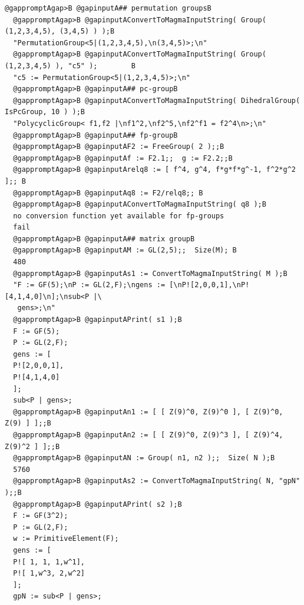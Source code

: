 \documentclass[a4paper,11pt]{report}
\begin{document}
{{{ 
\begin{Verbatim}[commandchars=@AB,fontsize=\small,frame=single,label=Example]
  @gappromptAgap>B @gapinputA## permutation groupsB
  @gappromptAgap>B @gapinputAConvertToMagmaInputString( Group( (1,2,3,4,5), (3,4,5) ) );B
  "PermutationGroup<5|(1,2,3,4,5),\n(3,4,5)>;\n"
  @gappromptAgap>B @gapinputAConvertToMagmaInputString( Group( (1,2,3,4,5) ), "c5" );        B
  "c5 := PermutationGroup<5|(1,2,3,4,5)>;\n"
  @gappromptAgap>B @gapinputA## pc-groupB
  @gappromptAgap>B @gapinputAConvertToMagmaInputString( DihedralGroup( IsPcGroup, 10 ) );B
  "PolycyclicGroup< f1,f2 |\nf1^2,\nf2^5,\nf2^f1 = f2^4\n>;\n"
  @gappromptAgap>B @gapinputA## fp-groupB
  @gappromptAgap>B @gapinputAF2 := FreeGroup( 2 );;B
  @gappromptAgap>B @gapinputAf := F2.1;;  g := F2.2;;B
  @gappromptAgap>B @gapinputArelq8 := [ f^4, g^4, f*g*f*g^-1, f^2*g^2 ];; B
  @gappromptAgap>B @gapinputAq8 := F2/relq8;; B
  @gappromptAgap>B @gapinputAConvertToMagmaInputString( q8 );B
  no conversion function yet available for fp-groups
  fail
  @gappromptAgap>B @gapinputA## matrix groupB
  @gappromptAgap>B @gapinputAM := GL(2,5);;  Size(M); B
  480
  @gappromptAgap>B @gapinputAs1 := ConvertToMagmaInputString( M );B
  "F := GF(5);\nP := GL(2,F);\ngens := [\nP![2,0,0,1],\nP![4,1,4,0]\n];\nsub<P |\
   gens>;\n"
  @gappromptAgap>B @gapinputAPrint( s1 );B
  F := GF(5);
  P := GL(2,F);
  gens := [
  P![2,0,0,1],
  P![4,1,4,0]
  ];
  sub<P | gens>;
  @gappromptAgap>B @gapinputAn1 := [ [ Z(9)^0, Z(9)^0 ], [ Z(9)^0, Z(9) ] ];;B
  @gappromptAgap>B @gapinputAn2 := [ [ Z(9)^0, Z(9)^3 ], [ Z(9)^4, Z(9)^2 ] ];;B
  @gappromptAgap>B @gapinputAN := Group( n1, n2 );;  Size( N );B
  5760
  @gappromptAgap>B @gapinputAs2 := ConvertToMagmaInputString( N, "gpN" );;B
  @gappromptAgap>B @gapinputAPrint( s2 );B
  F := GF(3^2);
  P := GL(2,F);
  w := PrimitiveElement(F);
  gens := [
  P![ 1, 1, 1,w^1],
  P![ 1,w^3, 2,w^2]
  ];
  gpN := sub<P | gens>;
\end{Verbatim}
 }

 }

 }

         
\end{document}
